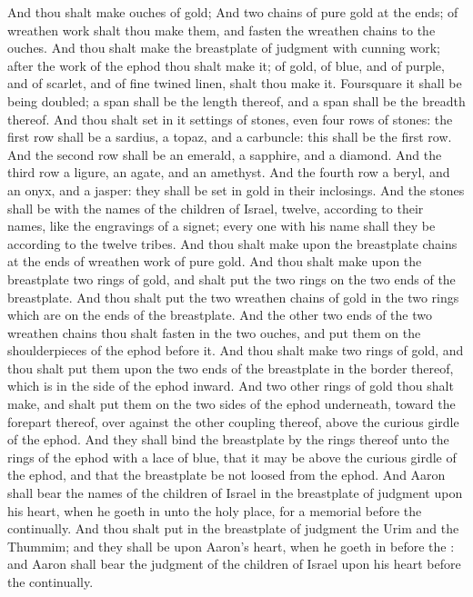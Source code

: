 \begin{biblechapter}
\verse And thou shalt make ouches of gold;
\verse And two chains of pure gold at the ends; of wreathen work shalt thou make them, and fasten the wreathen chains to the ouches.
 And thou shalt make the breastplate of judgment with cunning work; after the work of the ephod thou shalt make it; of gold, of blue, and of purple, and of scarlet, and of fine twined linen, shalt thou make it.
\verse Foursquare it shall be being doubled; a span shall be the length thereof, and a span shall be the breadth thereof.
\verse And thou shalt set in it settings of stones, even four rows of stones: the first row shall be a sardius, a topaz, and a carbuncle: this shall be the first row.
\verse And the second row shall be an emerald, a sapphire, and a diamond.
\verse And the third row a ligure, an agate, and an amethyst.
\verse And the fourth row a beryl, and an onyx, and a jasper: they shall be set in gold in their inclosings.
\verse And the stones shall be with the names of the children of Israel, twelve, according to their names, like the engravings of a signet; every one with his name shall they be according to the twelve tribes.
\verse And thou shalt make upon the breastplate chains at the ends of wreathen work of pure gold.
\verse And thou shalt make upon the breastplate two rings of gold, and shalt put the two rings on the two ends of the breastplate.
\verse And thou shalt put the two wreathen chains of gold in the two rings which are on the ends of the breastplate.
\verse And the other two ends of the two wreathen chains thou shalt fasten in the two ouches, and put them on the shoulderpieces of the ephod before it.
\verse And thou shalt make two rings of gold, and thou shalt put them upon the two ends of the breastplate in the border thereof, which is in the side of the ephod inward.
\verse And two other rings of gold thou shalt make, and shalt put them on the two sides of the ephod underneath, toward the forepart thereof, over against the other coupling thereof, above the curious girdle of the ephod.
\verse And they shall bind the breastplate by the rings thereof unto the rings of the ephod with a lace of blue, that it may be above the curious girdle of the ephod, and that the breastplate be not loosed from the ephod.
\verse And Aaron shall bear the names of the children of Israel in the breastplate of judgment upon his heart, when he goeth in unto the holy place, for a memorial before the \LORD continually.
\verse And thou shalt put in the breastplate of judgment the Urim and the Thummim; and they shall be upon Aaron's heart, when he goeth in before the \LORD: and Aaron shall bear the judgment of the children of Israel upon his heart before the \LORD continually.

\end{biblechapter}
